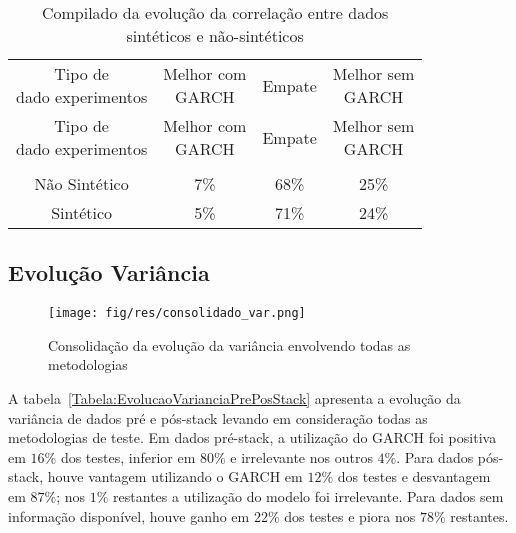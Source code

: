  \begin{center}
\begin{longtable}{cccc}
\toprule
\rowcolor{white}
 \caption{Compilado da evolução da correlação entre dados sintéticos e
 não-sintéticos} \label{Tabela:EvolucaoCorrelacaoSinteticoOuNaoSintetico} \\
\midrule
\rowcolor{white}
   \specialcell{Tipo de\\dado experimentos} & \specialcell{Melhor com\\GARCH} &
   Empate & \specialcell{Melhor sem\\GARCH} \\
\midrule
\endfirsthead
\midrule
\rowcolor{white}
   \specialcell{Tipo de\\dado experimentos} & \specialcell{Melhor com\\GARCH} &
   Empate & \specialcell{Melhor sem\\GARCH} \\
\toprule
\endhead
\midrule \\ %
\endfoot
\bottomrule
\endlastfoot
    Não Sintético & 7\%   & 68\%  & 25\% \\
    Sintético & 5\%   & 71\%  & 24\% \\
\end{longtable}
\end{center}

\subsection{Evolução Variância}

\begin{figure}[hbtp]
\centering
\texttt{[image: fig/res/consolidado\_var.png]}
\caption[Variância consolidada]{Consolidação da evolução da variância envolvendo
todas as metodologias}
\label{Figura:ConsolidadoVAR}
\end{figure}

A tabela~\ref{Tabela:EvolucaoVarianciaPrePosStack} apresenta a evolução da
variância de dados pré e pós-stack levando em consideração todas as
metodologias de teste. Em dados pré-stack, a utilização do GARCH foi positiva em
$16\%$ dos testes, inferior em $80\%$ e irrelevante nos outros $4\%$. Para dados
pós-stack, houve vantagem utilizando o GARCH em $12\%$ dos testes e desvantagem
em $87\%$; nos $1\%$ restantes a utilização do modelo foi irrelevante. Para
dados sem informação disponível, houve ganho em $22\%$ dos testes e piora nos
$78\%$ restantes.

